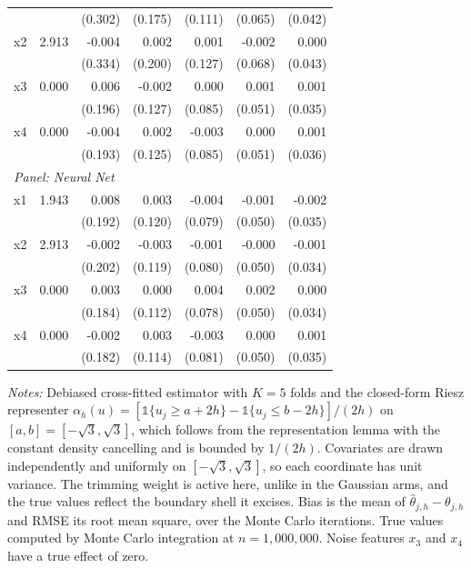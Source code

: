 \begin{table}[htbp]
\begin{threeparttable}
\begin{tabular}{lrrrrrr}
 &  & (0.302) & (0.175) & (0.111) & (0.065) & (0.042) \\
\quad x2 & 2.913 & -0.004 & 0.002 & 0.001 & -0.002 & 0.000 \\
 &  & (0.334) & (0.200) & (0.127) & (0.068) & (0.043) \\
\quad x3 & 0.000 & 0.006 & -0.002 & 0.000 & 0.001 & 0.001 \\
 &  & (0.196) & (0.127) & (0.085) & (0.051) & (0.035) \\
\quad x4 & 0.000 & -0.004 & 0.002 & -0.003 & 0.000 & 0.001 \\
 &  & (0.193) & (0.125) & (0.085) & (0.051) & (0.036) \\
\midrule
\multicolumn{7}{l}{\textit{Panel: Neural Net}} \\
\quad x1 & 1.943 & 0.008 & 0.003 & -0.004 & -0.001 & -0.002 \\
 &  & (0.192) & (0.120) & (0.079) & (0.050) & (0.035) \\
\quad x2 & 2.913 & -0.002 & -0.003 & -0.001 & -0.000 & -0.001 \\
 &  & (0.202) & (0.119) & (0.080) & (0.050) & (0.034) \\
\quad x3 & 0.000 & 0.003 & 0.000 & 0.004 & 0.002 & 0.000 \\
 &  & (0.184) & (0.112) & (0.078) & (0.050) & (0.034) \\
\quad x4 & 0.000 & -0.002 & 0.003 & -0.003 & 0.000 & 0.001 \\
 &  & (0.182) & (0.114) & (0.081) & (0.050) & (0.035) \\
\bottomrule
\end{tabular}
\begin{tablenotes}
\footnotesize
\item \textit{Notes:} Debiased cross-fitted estimator with $K=5$ folds and the closed-form Riesz representer $\alpha_h(u) = [\mathbb{1}\{u_j \geq a + 2h\} - \mathbb{1}\{u_j \leq b - 2h\}]/(2h)$ on $[a,b] = [-\sqrt{3},\sqrt{3}]$, which follows from the representation lemma with the constant density cancelling and is bounded by $1/(2h)$. Covariates are drawn independently and uniformly on $[-\sqrt{3},\sqrt{3}]$, so each coordinate has unit variance. The trimming weight is active here, unlike in the Gaussian arms, and the true values reflect the boundary shell it excises. Bias is the mean of $\hat{\theta}_{j,h} - \theta_{j,h}$ and RMSE its root mean square, over the Monte Carlo iterations. True values computed by Monte Carlo integration at $n=1{,}000{,}000$. Noise features $x_3$ and $x_4$ have a true effect of zero.
\end{tablenotes}
\end{threeparttable}
\end{table}